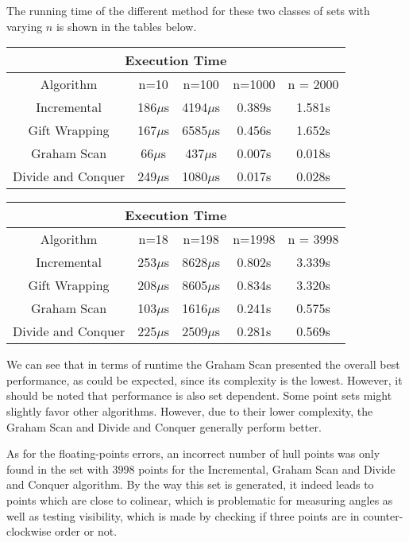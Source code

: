 \documentclass[a4paper, 10pt, conference]{ieeeconf}      %
\begin{document}
The running time of the different method for these two classes of sets with varying $n$ is shown in the tables below.

\begin{center}
 \begin{tabular}{||c c c c c ||} 
 \hline 
  \multicolumn{5}{|c|}{Execution Time} \\
 \hline
 Algorithm & n=10 & n=100 & n=1000 & n = 2000\\
 \hline
 Incremental & 186$\mu$s & 4194$\mu$s & 0.389s & 1.581s  \\ 
 \hline
 Gift Wrapping & 167$\mu$s & 6585$\mu$s & 0.456s & 1.652s \\
 \hline
 Graham Scan & 66$\mu$s & 437$\mu$s & 0.007s & 0.018s \\
 \hline
 Divide and Conquer & 249$\mu$s & 1080$\mu$s & 0.017s & 0.028s \\
\hline
\end{tabular}
\end{center}

\begin{center}
 \begin{tabular}{||c c c c c ||} 
 \hline 
  \multicolumn{5}{|c|}{Execution Time} \\
 \hline
 Algorithm & n=18 & n=198 & n=1998 & n = 3998\\
 \hline
 Incremental & 253$\mu$s & 8628$\mu$s & 0.802s & 3.339s  \\ 
 \hline
 Gift Wrapping & 208$\mu$s & 8605$\mu$s & 0.834s & 3.320s \\
 \hline
 Graham Scan & 103$\mu$s & 1616$\mu$s & 0.241s & 0.575s \\
 \hline
 Divide and Conquer & 225$\mu$s & 2509$\mu$s & 0.281s & 0.569s \\
\hline
\end{tabular}
\end{center}

We can see that in terms of runtime the Graham Scan presented the overall best performance, as could be expected, since its complexity is the lowest.
However, it should be noted that performance is also set dependent.
Some point sets might slightly favor other algorithms.
However, due to their lower complexity, the Graham Scan and Divide and Conquer generally perform better.

As for the floating-points errors, an incorrect number of hull points was only found in the set with $3998$ points for the Incremental, Graham Scan and Divide and Conquer algorithm.
By the way this set is generated, it indeed leads to points which are close to colinear, which is problematic for measuring angles as well as testing visibility, which is made by checking if three points are in counter-clockwise order or not.
\end{document}
